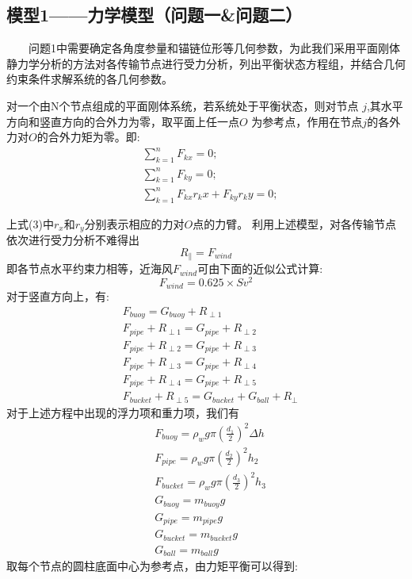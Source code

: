 \documentclass[a4paper,12pt]{ctexart}
\begin{document}
\subsection{模型1——力学模型（问题一\&问题二）}

~~~~问题1中需要确定各角度参量和锚链位形等几何参数，为此我们采用平面刚体静力学分析的方法对各传输节点进行受力分析，列出平衡状态方程组，并结合几何约束条件求解系统的各几何参数。

对一个由N个节点组成的平面刚体系统，若系统处于平衡状态，则对节点 $j$,其水平方向和竖直方向的合外力为零，取平面上任一点$O$ 为参考点，作用在节点$j$的各外力对$O$的合外力矩为零。即:
\begin{align}\label{PlanerRigidBodyEqulibriumEquation}
&\sum\limits_{k=1}^n F_{kx}  =0;\\
&\sum\limits_{k=1}^n F_{ky}  =0;\\
&\sum\limits_{k=1}^n F_{kx}r_kx+F_{ky}r_ky  =0;
\end{align}

上式(3)中$r_x$和$r_y$分别表示相应的力对$O$点的力臂。
利用上述模型，对各传输节点依次进行受力分析不难得出
\begin{equation}
R_{\parallel}=F_{wind}\label{MechanicsBegin}
\end{equation}
即各节点水平约束力相等，近海风$F_{wind}$可由下面的近似公式计算:
\begin{equation}
F_{wind}=0.625\times S v^2
\end{equation}
对于竖直方向上，有:
\begin{align}
&F_{buoy}=G_{buoy}+R_{\perp1}\\
&F_{pipe}+R_{\perp1}=G_{pipe}+R_{\perp2}\\
&F_{pipe}+R_{\perp2}=G_{pipe}+R_{\perp3}\\
&F_{pipe}+R_{\perp3}=G_{pipe}+R_{\perp4}\\
&F_{pipe}+R_{\perp4}=G_{pipe}+R_{\perp5}\\
&F_{bucket}+R_{\perp5}=G_{bucket}+G_{ball}+R_{\perp}
\end{align}
对于上述方程中出现的浮力项和重力项，我们有
\begin{align}
&F_{buoy}=\rho_w g \pi (\frac{d_1}{2})^2 \Delta h \\
&F_{pipe}=\rho_w g \pi (\frac{d_2}{2})^2 h_2 \\
&F_{bucket}=\rho_w g \pi (\frac{d_3}{2})^2 h_3 \\
&G_{buoy}=m_{buoy}g\\
&G_{pipe}=m_{pipe}g\\
&G_{bucket}=m_{bucket} g\\
&G_{ball}=m_{ball} g
\end{align}
取每个节点的圆柱底面中心为参考点，由力矩平衡可以得到:
\end{document}
